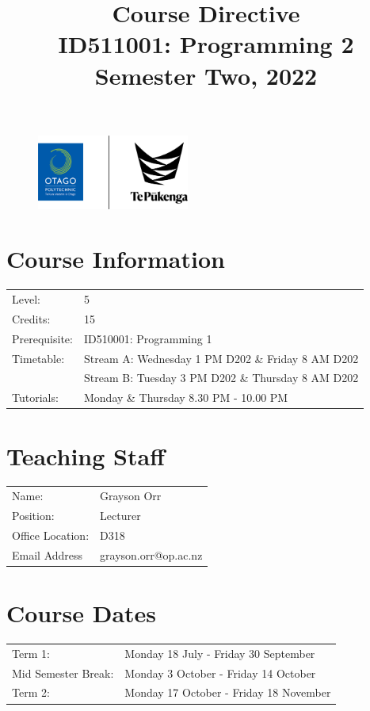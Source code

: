 \documentclass{article}
\author{}
\begin{document}
\begin{figure}
	\includegraphics[width=50mm]{../img/logo.png}
\end{figure}

\title{Course Directive\\ID511001: Programming 2\\Semester Two, 2022}
\date{}
\maketitle

\section*{Course Information}
\begin{tabular}{ll}
	Level:        & 5 \\
	Credits:      & 15                                                             \\
	Prerequisite: & ID510001: Programming 1                                  \\
	Timetable:    & Stream A: Wednesday 1 PM D202 \& Friday 8 AM D202  \\
	& Stream B: Tuesday 3 PM D202 \& Thursday 8 AM D202  \\
	Tutorials:    & Monday \& Thursday 8.30 PM - 10.00 PM                                    
\end{tabular}

\section*{Teaching Staff}
\begin{tabular}{ll}
	Name:            & Grayson Orr                           \\
	Position:        & Lecturer \\
	Office Location: & D318                                 \\
	Email Address    & grayson.orr@op.ac.nz                    \\
\end{tabular}

\section*{Course Dates}
\begin{tabular}{ll}
	Term 1:             &  Monday 18 July - Friday 30 September \\
	Mid Semester Break: &  Monday 3 October - Friday 14 October     \\
	Term 2:             &  Monday 17 October - Friday 18 November      \\
\end{tabular}
\end{document}
